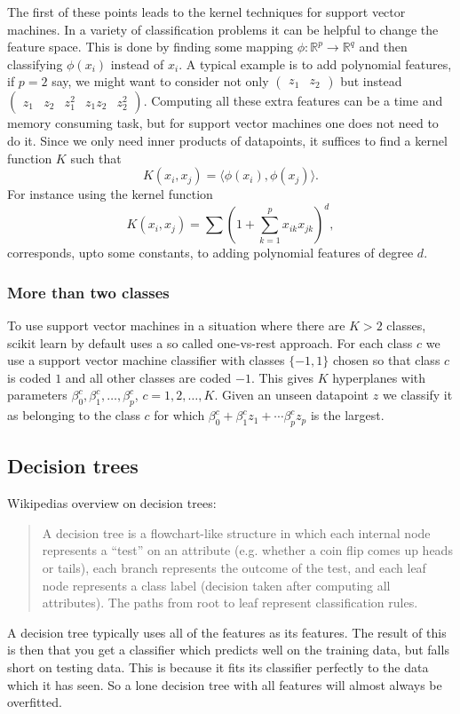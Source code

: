 \documentclass[parskip=half]{scrartcl}
\theoremstyle{definition}
\theoremstyle{remark}
\newcommand{\R}{\mathbb{R}}
\begin{document}
The first of these points leads to the kernel techniques for support vector machines.
In a variety of classification problems it can be helpful to change the feature space. 
This is done by finding some mapping $\phi \colon \R^p \to \R^q$ and then classifying $\phi(x_i)$ instead of $x_i$. 
A typical example is to add polynomial features, if $p = 2$ say, we might want to consider not only $\begin{pmatrix} z_1 & z_2 \end{pmatrix}$ but instead $\begin{pmatrix} z_1 & z_2 & z_1^2 & z_1 z_2 & z_2^2 \end{pmatrix}$.  
Computing all these extra features can be a time and memory consuming task, but for support vector machines one does not need to do it. 
Since we only need inner products of datapoints, it suffices to find a kernel function $K$ such that 
\[
	K(x_i, x_j) = \langle \phi(x_i), \phi(x_j) \rangle.
\]
For instance using the kernel function
\[
	K(x_i, x_j) = \sum \left( 1 + \sum_{k=1}^p x_{ik} x_{jk} \right)^d,
\]
corresponds, upto some constants, to adding polynomial features of degree $d$. 

\subsubsection{More than two classes}

To use support vector machines in a situation where there are $K > 2$ classes, scikit learn by default uses a so called one-vs-rest approach. 
For each class $c$ we use a support vector machine classifier with classes $\{-1, 1\}$ chosen so that class $c$ is coded $1$ and all other classes are coded $-1$.
This gives $K$ hyperplanes with parameters $\beta_0^c, \beta_1^c, \ldots, \beta_p^c$, $c = 1,2,\ldots, K$.
Given an unseen datapoint $z$ we classify it as belonging to the class $c$ for which $\beta_0^c + \beta_1^c z_1 + \cdots \beta_p^c z_p$ is the largest.    
  
\subsection{Decision trees}
Wikipedias overview on decision trees:
\begin{quotation}
	A decision tree is a flowchart-like structure in which each internal node represents a ``test'' on an attribute (e.g. whether a coin flip comes up heads or tails), each branch represents the outcome of the test, and each leaf node represents a class label (decision taken after computing all attributes). The paths from root to leaf represent classification rules.
\end{quotation}
A decision tree typically uses all of the features as its features. The result of this is then that you get a classifier which predicts well on the training data, but falls short on testing data. This is because it fits its classifier perfectly to the data which it has seen. So a lone decision tree with all features will almost always be overfitted.
\end{document}
